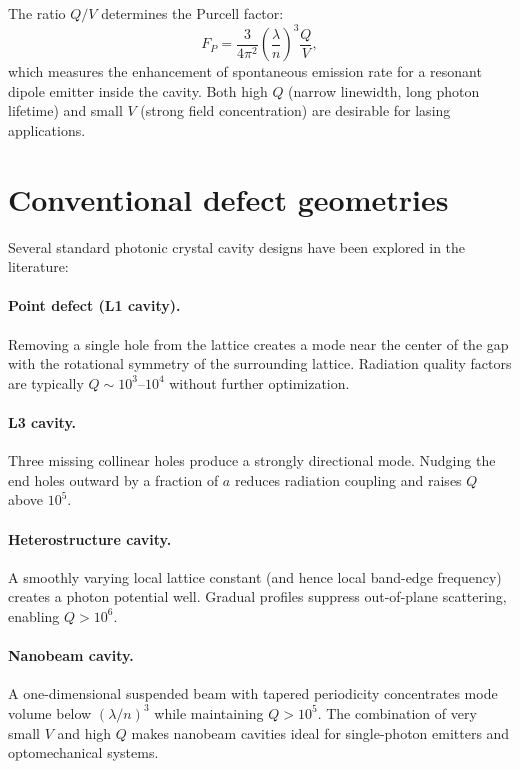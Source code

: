 \documentclass[12pt,a4paper,oneside]{book}
\theoremstyle{plain}
\theoremstyle{definition}
\theoremstyle{remark}
\begin{document}
The ratio $Q/V$ determines the Purcell factor:
\begin{equation}
  F_P = \frac{3}{4\pi^2}\left(\frac{\lambda}{n}\right)^3\frac{Q}{V},
\end{equation}
which measures the enhancement of spontaneous emission rate for a resonant dipole emitter inside the cavity. Both high $Q$ (narrow linewidth, long photon lifetime) and small $V$ (strong field concentration) are desirable for lasing applications.

\section{Conventional defect geometries}
\label{sec:conventional-defects}

Several standard photonic crystal cavity designs have been explored in the literature:

\paragraph{Point defect (L1 cavity).} Removing a single hole from the lattice creates a mode near the center of the gap with the rotational symmetry of the surrounding lattice. Radiation quality factors are typically $Q \sim 10^3$--$10^4$ without further optimization.

\paragraph{L3 cavity.} Three missing collinear holes produce a strongly directional mode. Nudging the end holes outward by a fraction of $a$ reduces radiation coupling and raises $Q$ above $10^5$.

\paragraph{Heterostructure cavity.} A smoothly varying local lattice constant (and hence local band-edge frequency) creates a photon potential well. Gradual profiles suppress out-of-plane scattering, enabling $Q > 10^6$.

\paragraph{Nanobeam cavity.} A one-dimensional suspended beam with tapered periodicity concentrates mode volume below $(\lambda/n)^3$ while maintaining $Q > 10^5$. The combination of very small $V$ and high $Q$ makes nanobeam cavities ideal for single-photon emitters and optomechanical systems.
\end{document}
